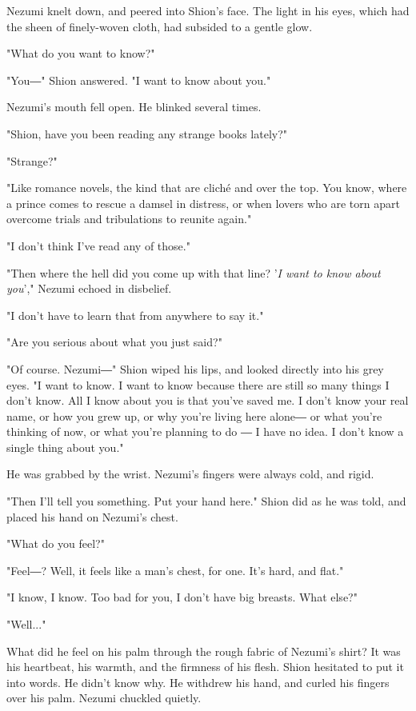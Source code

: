 Nezumi knelt down, and peered into Shion's face. The light in his eyes,
which had the sheen of finely-woven cloth, had subsided to a gentle
glow.

"What do you want to know?"

"You―" Shion answered. "I want to know about you."

Nezumi's mouth fell open. He blinked several times.

"Shion, have you been reading any strange books lately?"

"Strange?"

"Like romance novels, the kind that are cliché and over the top. You
know, where a prince comes to rescue a damsel in distress, or when
lovers who are torn apart overcome trials and tribulations to reunite
again."

"I don't think I've read any of those."

"Then where the hell did you come up with that line? '\emph{I want to know
about you}'," Nezumi echoed in disbelief.

"I don't have to learn that from anywhere to say it."

"Are you serious about what you just said?"

"Of course. Nezumi―" Shion wiped his lips, and looked directly into his
grey eyes. "I want to know. I want to know because there are still so
many things I don't know. All I know about you is that you've saved me.
I don't know your real name, or how you grew up, or why you're living
here alone― or what you're thinking of now, or what you're planning to
do ― I have no idea. I don't know a single thing about you."

He was grabbed by the wrist. Nezumi's fingers were always cold, and
rigid.

"Then I'll tell you something. Put your hand here." Shion did as he was
told, and placed his hand on Nezumi's chest.

"What do you feel?"

"Feel―? Well, it feels like a man's chest, for one. It's hard, and
flat."

"I know, I know. Too bad for you, I don't have big breasts. What else?"

"Well..."

What did he feel on his palm through the rough fabric of Nezumi's shirt?
It was his heartbeat, his warmth, and the firmness of his flesh. Shion
hesitated to put it into words. He didn't know why. He withdrew his
hand, and curled his fingers over his palm. Nezumi chuckled quietly.


